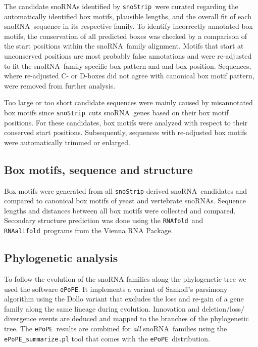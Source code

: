 \documentclass[preprint,3p,times,twocolumn]{elsarticle}
\newcommand{\JH}[1]{\begingroup\color{purple}#1\endgroup}
\newcommand{\SB}[1]{\begingroup\color{turquoise}#1\endgroup}
\newcommand{\sno}{snoRNA}
\newcommand{\snostrip}{\texttt{snoStrip}}
\newcommand{\epope}{\texttt{ePoPE}}
\newcommand{\fold}{\texttt{RNAfold}}
\newcommand{\alifold}{\texttt{RNAalifold}}
\begin{document}
The candidate snoRNAs identified by \snostrip\ were curated regarding
the automatically identified box motifs, plausible lengths, and the
overall fit of each \sno\ sequence in its respective family. \SB{ To
  identify incorrectly annotated box motifs, the conservation of all
  predicted boxes was checked by a comparison of the start positions
  within the \sno\ family alignment. Motifs that start at unconserved
  positions are most probably false annotations and were re-adjusted
  to fit the \sno\ family specific box pattern and and box position.
  Sequences, where re-adjusted C- or D-boxes did not agree with
  canonical box motif pattern, were removed from further analysis.}

\SB{Too large or too short candidate sequences were mainly caused by
  misannotated box motifs since \snostrip\ cuts \sno\ genes based on
  their box motif positions. For these candidates, box motifs were
  analyzed with respect to their conserved start positions.
  Subsequently, sequences with re-adjusted box motifs were
  automatically trimmed or enlarged.}

\subsection{Box motifs, sequence and structure}

Box motifs were generated from all \snostrip-derived \sno\ candidates
and compared to canonical box motifs of yeast and vertebrate snoRNAs.
Sequence lengths and distances between all box motifs were collected
and compared. Secondary structure prediction was done using the \fold\
and \alifold\ programs from the Vienna RNA
Package\cite{Hofacker:1994}.

\subsection{Phylogenetic analysis}

To follow the evolution of the snoRNA families along the phylogenetic
tree we used the software \epope\cite{Hertel:2015}.  It implements a
variant of Sankoff’s parsimony algorithm using the Dollo variant that
excludes the loss and re-gain of a gene family along the same lineage
during evolution.  Innovation and deletion$/$loss$/$divergence events
are deduced and mapped to the branches of the phylogenetic tree.  The
\epope\ results are combined for \emph{all} \sno\ families using the
\texttt{ePoPE\_summarize.pl} tool that comes with the \epope\
distribution.
\end{document}
